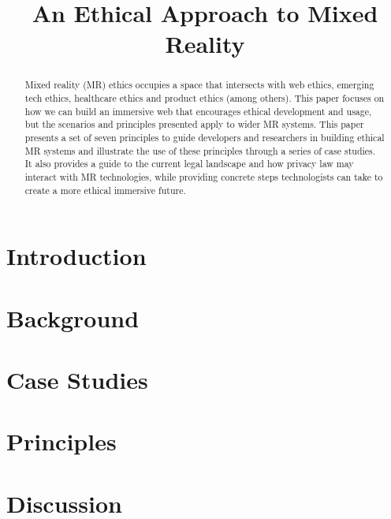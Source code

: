 \documentclass[letterpaper,twocolumn,10pt]{article}
\begin{document}
\date{}
\title{\Large \bf An Ethical Approach to Mixed Reality}
\maketitle
\thecopyright


\begin{abstract}
Mixed reality (MR) ethics occupies a space that intersects with web ethics, emerging tech ethics, healthcare ethics and product ethics (among others). This paper focuses on how we can build an immersive web that encourages ethical development and usage, but the scenarios and principles presented apply to wider MR systems. This paper presents a set of seven principles to guide developers and researchers in building ethical MR systems and illustrate the use of these principles through a series of case studies. It also provides a guide to the current legal landscape and how privacy law may interact with MR technologies, while providing concrete steps technologists can take to create a more ethical immersive future.

\end{abstract}


\section{Introduction}


\section{Background}\label{sec:background}


\section{Case Studies}\label{sec:studies}


\section{Principles}\label{sec:principle}


\section{Discussion}\label{sec:discussion}

\end{document}
